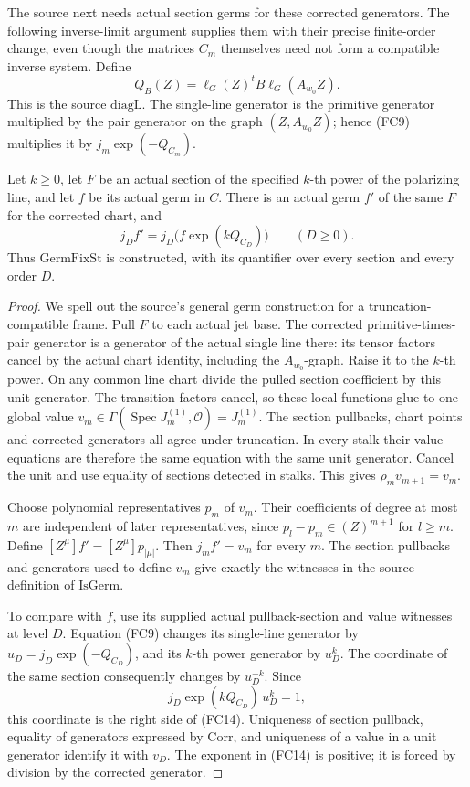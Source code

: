 The source next needs actual section germs for these
corrected generators.  The following inverse-limit
argument supplies them with their precise finite-order
change, even though the matrices \(C_m\) themselves
need not form a compatible inverse system.
Define
\[
 Q_B(Z)=\ell_G(Z)^tB\ell_G(A_{w_0}Z).                        \tag{FC13}
\]
This is the source \(\mathrm{diagL}\).
The single-line generator is the primitive generator
multiplied by the pair generator on the graph
\((Z,A_{w_0}Z)\); hence (FC9) multiplies it by
\(j_m\exp(-Q_{C_m})\).

\begin{srproposition}
\label{prop:sr-source-actual-frame-germ-fix}
Let \(k\ge0\), let \(F\) be an actual section of the
specified \(k\)-th power of the polarizing line, and
let \(f\) be its actual germ in \(C\).
There is an actual germ \(f'\) of the same \(F\)
for the corrected chart, and
\[
              j_Df'=j_D\bigl(f\exp(kQ_{C_D})\bigr)
                                      \qquad(D\ge0).        \tag{FC14}
\]
Thus \(\mathrm{GermFixSt}\) is constructed, with its
quantifier over every section and every order \(D\).
\end{srproposition}
\begin{proof}
We spell out the source's general germ construction for
a truncation-compatible frame.
Pull \(F\) to each actual jet base.
The corrected primitive-times-pair generator is a
generator of the actual single line there: its tensor
factors cancel by the actual chart identity, including
the \(A_{w_0}\)-graph.
Raise it to the \(k\)-th power.
On any common line chart divide the pulled section
coefficient by this unit generator.
The transition factors cancel, so these local functions
glue to one global value \(v_m\in\Gamma(\operatorname{Spec}
J_m^{(1)},\mathcal O)=J_m^{(1)}\).
The section pullbacks, chart points and corrected
generators all agree under truncation.
In every stalk their value equations are therefore the
same equation with the same unit generator.
Cancel the unit and use equality of sections detected
in stalks.  This gives \(\rho_mv_{m+1}=v_m\).

Choose polynomial representatives \(p_m\) of \(v_m\).
Their coefficients of degree at most \(m\) are independent
of later representatives, since
\(p_l-p_m\in(Z)^{m+1}\) for \(l\ge m\).
Define
\([Z^\mu]f'=[Z^\mu]p_{|\mu|}\).
Then \(j_mf'=v_m\) for every \(m\).
The section pullbacks and generators used to define
\(v_m\) give exactly the witnesses in the source
definition of \(\mathrm{IsGerm}\).

To compare with \(f\), use its supplied actual
pullback-section and value witnesses at level \(D\).
Equation (FC9) changes its single-line generator by
\(u_D=j_D\exp(-Q_{C_D})\), and its \(k\)-th power
generator by \(u_D^k\).
The coordinate of the same section consequently changes
by \(u_D^{-k}\).
Since
\[
 j_D\exp(kQ_{C_D})\,u_D^k=1,
\]
this coordinate is the right side of (FC14).
Uniqueness of section pullback, equality of generators
expressed by \(\mathrm{Corr}\), and uniqueness of a
value in a unit generator identify it with \(v_D\).
The exponent in (FC14) is positive; it is forced by
division by the corrected generator.
\end{proof}

